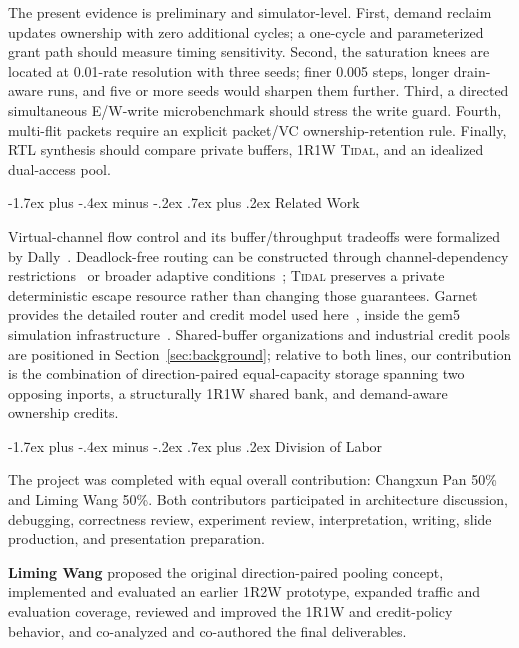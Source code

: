 \documentclass[10pt,twocolumn]{article}
\makeatletter
\newcommand{\system}{\textsc{Tidal}\xspace}
\renewcommand\section{\@startsection{section}{1}{\z@}%
  {-1.7ex plus -.4ex minus -.2ex}%
  {.7ex plus .2ex}%
  {\normalfont\large\bfseries}}
\makeatother
\begin{document}
The present evidence is preliminary and simulator-level. First, demand reclaim
updates ownership with zero additional cycles; a one-cycle and parameterized
grant path should measure timing sensitivity. Second, the saturation knees
are located at 0.01-rate resolution with three seeds; finer 0.005 steps,
longer drain-aware runs, and five or more seeds would sharpen them further.
Third, a directed simultaneous E/W-write microbenchmark
should stress the write guard. Fourth, multi-flit packets require an explicit
packet/VC ownership-retention rule. Finally, RTL synthesis should compare
private buffers, 1R1W \system, and an idealized dual-access pool.

\section{Related Work}

Virtual-channel flow control and its buffer/throughput tradeoffs were
formalized by Dally~\cite{dally1992virtual}. Deadlock-free routing can be
constructed through channel-dependency restrictions~\cite{dally1987deadlock}
or broader adaptive conditions~\cite{duato1993theory}; \system preserves a
private deterministic escape resource rather than changing those guarantees.
Garnet provides the detailed router and credit model used
here~\cite{agarwal2009garnet}, inside the gem5 simulation
infrastructure~\cite{binkert2011gem5}. Shared-buffer organizations and
industrial credit pools are positioned in Section~\ref{sec:background};
relative to both lines, our contribution is the combination of
direction-paired equal-capacity storage spanning two opposing inports, a
structurally 1R1W shared bank, and demand-aware ownership credits.

\section{Division of Labor}

The project was completed with equal overall contribution: Changxun Pan 50\%
and Liming Wang 50\%. Both contributors participated in architecture
discussion, debugging, correctness review, experiment review, interpretation,
writing, slide production, and presentation preparation.

\textbf{Liming Wang} proposed the original direction-paired pooling concept,
implemented and evaluated an earlier 1R2W prototype, expanded traffic and
evaluation coverage, reviewed and improved the 1R1W and credit-policy behavior, and
co-analyzed and co-authored the final deliverables.
\end{document}
